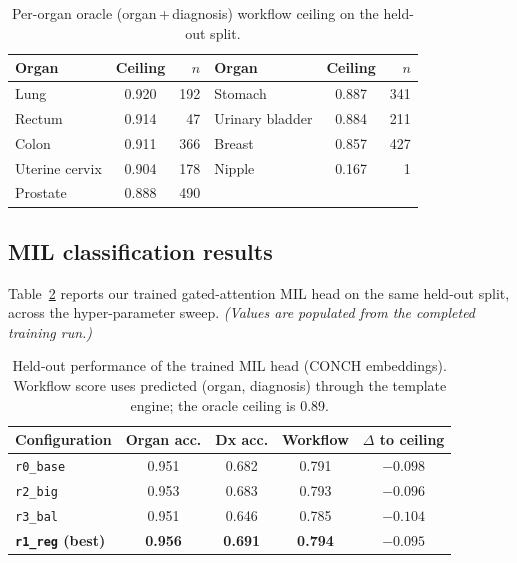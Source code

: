 \documentclass[11pt,a4paper]{article}
\newcommand{\code}[1]{\texttt{\small #1}}
\begin{document}
\begin{table}[h]
\centering
\caption{Per-organ oracle (organ\,+\,diagnosis) workflow ceiling on the held-out split.}
\label{tab:oracle_organ}
\begin{tabular}{lcr@{\hspace{2.5em}}lcr}
\toprule
Organ & Ceiling & $n$ & Organ & Ceiling & $n$ \\
\midrule
Lung           & 0.920 & 192 & Stomach         & 0.887 & 341 \\
Rectum         & 0.914 &  47 & Urinary bladder & 0.884 & 211 \\
Colon          & 0.911 & 366 & Breast          & 0.857 & 427 \\
Uterine cervix & 0.904 & 178 & Nipple          & 0.167 &   1 \\
Prostate       & 0.888 & 490 & & & \\
\bottomrule
\end{tabular}
\end{table}

\subsection{MIL classification results}
Table~\ref{tab:mil} reports our trained gated-attention MIL head on the same held-out split,
across the hyper-parameter sweep. \emph{(Values are populated from the completed training
run.)}

\begin{table}[h]
\centering
\caption{Held-out performance of the trained MIL head (CONCH embeddings). Workflow score uses
predicted (organ, diagnosis) through the template engine; the oracle ceiling is 0.89.}
\label{tab:mil}
\begin{tabular}{lcccc}
\toprule
Configuration & Organ acc. & Dx acc. & Workflow & $\Delta$ to ceiling \\
\midrule
\code{r0\_base} & 0.951 & 0.682 & 0.791 & $-0.098$ \\
\code{r2\_big}  & 0.953 & 0.683 & 0.793 & $-0.096$ \\
\code{r3\_bal}  & 0.951 & 0.646 & 0.785 & $-0.104$ \\
\midrule
\textbf{\code{r1\_reg} (best)} & \textbf{0.956} & \textbf{0.691} & \textbf{0.794} & $\mathbf{-0.095}$ \\
\bottomrule
\end{tabular}
\end{table}
\end{document}
